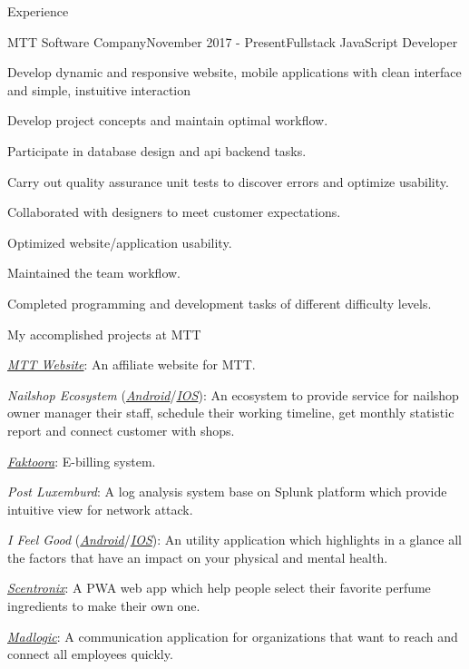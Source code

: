 \documentclass{resume}
\begin{document}
  \begin{rSection}{Experience}
    \begin{rSubsection}{MTT Software Company}{November 2017 - Present}{Fullstack JavaScript Developer}{}
      \item Develop dynamic and responsive website, mobile applications with clean interface and simple, instuitive interaction
      \item Develop project concepts and maintain optimal workflow.
      \item Participate in database design and api backend tasks.
      \item Carry out quality assurance unit tests to discover errors and optimize usability.
      \item Collaborated with designers to meet customer expectations.
      \item Optimized website/application usability.
      \item Maintained the team workflow.
      \item Completed programming and development tasks of different difficulty levels.
    \end{rSubsection}

    \begin{rSubsection}{}{}{My accomplished projects at MTT}{}
      \item \href{https://mttjsc.com/}{\emph{MTT Website}}: An affiliate website for MTT.
      \item \emph{Nailshop Ecosystem} (\href{https://play.google.com/store/apps/developer?id=MTT+Software+Company+LTD/}{\emph{Android}}/\href{https://apps.apple.com/us/developer/mttjsc/id1250334932}{\emph{IOS}}): 
      An ecosystem to provide service for nailshop owner manager their
      staff, schedule their working timeline, get monthly statistic report and connect customer with shops.
      \item \href{http://app.faktoora.com}{\emph{Faktoora}}: E-billing system.
      \item \emph{Post Luxemburd}: A log analysis system base on Splunk platform which provide intuitive view for network attack.
      \item \emph{I Feel Good} (\href{https://play.google.com/store/apps/details?id=com.ifg_mobile}{\emph{Android}}/\href{}{\emph{IOS}}): 
      An utility application which highlights in a glance all the factors that have an impact on your physical and mental health.
      \item \href{https://app.scnt.me/}{\emph{Scentronix}}: A PWA web app which help people select their favorite perfume ingredients to make their own one.
      \item \href{https://www.madlogic.nl/magic/}{\emph{Madlogic}}: A communication application for organizations that want to reach and connect all employees quickly.
    \end{rSubsection}
  

\end{rSection}
\end{document}
